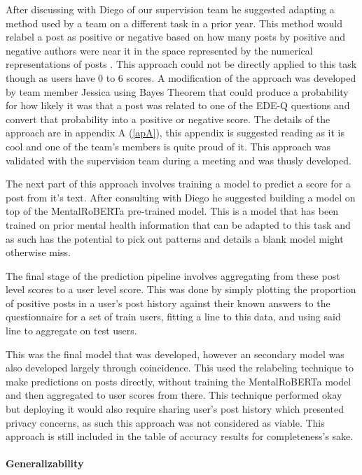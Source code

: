 \documentclass[12pt, titlepage]{article}
\begin{document}
After discussing with Diego of our supervision team he suggested adapting a method used by a team on a different task in a prior year. This method would relabel a post as positive or negative based on how many posts by positive and negative authors were near it in the space represented by the numerical representations of posts \citep{Fabregat}. This approach could not be directly applied to this task though as users have 0 to 6 scores. A modification of the approach was developed by team member Jessica using Bayes Theorem that could produce a probability for how likely it was that a post was related to one of the EDE-Q questions and convert that probability into a positive or negative score. The details of the approach are in appendix A (\ref{apA}), this appendix is suggested reading as it is cool and one of the team's members is quite proud of it. This approach was validated with the supervision team during a meeting and was thusly developed.

The next part of this approach involves training a model to predict a score for a post from it's text. After consulting with Diego he suggested building a model on top of the MentalRoBERTa pre-trained model. This is a model that has been trained on prior mental health information that can be adapted to this task and as such has the potential to pick out patterns and details a blank model might otherwise miss.

The final stage of the prediction pipeline involves aggregating from these post level scores to a user level score. This was done by simply plotting the proportion of positive posts in a user's post history against their known answers to the questionnaire for a set of train users, fitting a line to this data, and using said line to aggregate on test users.

This was the final model that was developed, however an secondary model was also developed largely through coincidence. This used the relabeling technique to make predictions on posts directly, without training the MentalRoBERTa model and then aggregated to user scores from there. This technique performed okay but deploying it would also require sharing user's post history which presented privacy concerns, as such this approach was not considered as viable. This approach is still included in the table of accuracy results for completeness's sake.

\paragraph{Generalizability\newline}
\end{document}
